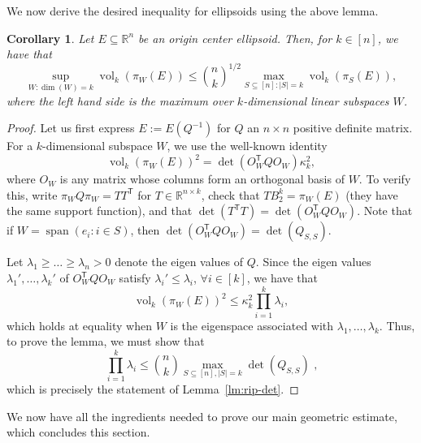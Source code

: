 \documentclass[12pt]{article}
\newtheorem{corollary}[theorem]{Corollary}
\newcommand{\R}{{\mathbb{R}}}
\newcommand{\T}{\mathsf T}
\DeclareMathOperator{\vol}{vol}
\DeclareMathOperator{\lspan}{span}
\begin{document}
We now derive the desired inequality for ellipsoids using the above lemma.

\begin{corollary}\label{cor:ellipsoids}
Let $E \subseteq \R^n$ be an origin center ellipsoid. Then, for $k \in [n]$, we
have that
\[
\sup_{W: \dim(W)=k} \vol_k(\pi_W(E)) \le \binom{n}{k}^{1/2}
  \max_{S \subseteq [n]: |S| = k} \vol_k(\pi_S(E)),
\]
where the left hand side is the maximum over $k$-dimensional linear subspaces $W$.
\end{corollary}
\begin{proof}
Let us first express $E := E(Q^{-1})$ for $Q$ an $n \times n$ positive definite
matrix. For a $k$-dimensional subspace $W$, we use the well-known identity
\[
\vol_k(\pi_W(E))^2 = \det(O_W^\T Q O_W) \kappa^2_k,
\]
where $O_W$ is any matrix whose columns form an orthogonal basis of $W$. To
verify this, write $\pi_W Q \pi_W = T T^\T$ for $T \in \R^{n \times k}$, check
that $T B_2^k = \pi_W(E)$ (they have the same support function), and that
$\det(T^\T T) = \det(O_W^\T Q O_W)$. Note that if $W = \lspan(e_i: i \in S)$,
then $\det(O_W^\T Q O_W) = \det(Q_{S,S})$.

Let $\lambda_1 \geq \dots \geq \lambda_n > 0$ denote the eigen values of $Q$.
Since the eigen values $\lambda_1',\dots,\lambda_k'$ of $O_W^\T Q O_W$ satisfy
$\lambda_i' \leq \lambda_i$, $\forall i \in [k]$, we have that 
\[
\vol_k(\pi_W(E))^2 \leq \kappa_k^2 \prod_{i=1}^k \lambda_i, 
\]
which holds at equality when $W$ is the eigenspace associated with
$\lambda_1,\dots,\lambda_k$. Thus, to prove the lemma, we must show that
\[
\prod_{i=1}^k \lambda_i \leq \binom{n}{k} \max_{S \subseteq [n], |S|=k}
\det(Q_{S,S}) \text{ ,}
\]
which is precisely the statement of Lemma~\ref{lm:rip-det}.
\end{proof}

We now have all the ingredients needed to prove our main geometric estimate,
which concludes this section.
\end{document}
